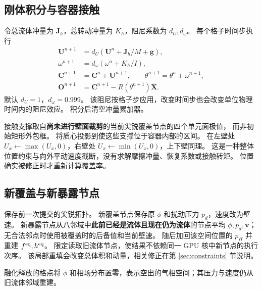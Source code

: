 
\subsection{刚体积分与容器接触}
令总流体冲量为 $\bm J_h$，总转动冲量为 $K_h$，阻尼系数为 $d_U,d_\omega$。
每个格子时间步执行
\begin{align}
 \bm U^{n+1}&=d_U(\bm U^n+\bm J_h/M+\bm g),\\
 \omega^{n+1}&=d_\omega(\omega^n+K_h/I),\\
 \bm C^{n+1}&=\bm C^n+\bm U^{n+1},\qquad
 \theta^{n+1}=\theta^n+\omega^{n+1},\\
 \bm O^{n+1}&=\bm C^{n+1}-R(\theta^{n+1})\bar{\bm X}.
\end{align}
默认 $d_U=1$，$d_\omega=0.999$。
该阻尼按格子步应用，改变时间步也会改变单位物理时间内的阻尼效应。
积分后清空冲量累加器。

接触支撑取自\textbf{尚未进行壁面裁剪}的当前尖锐覆盖节点的四个单元面极值，
而非初始矩形外包框。
将质心投影到使这些支撑位于容器内部的区间。
在左壁处 $U_x\leftarrow\max(U_x,0)$，右壁处
$U_x\leftarrow\min(U_x,0)$，上下壁同理。
这是一种整体位置约束与向外平动速度截断，没有求解摩擦冲量、恢复系数或接触转矩。
位置确实被修正时才重新计算覆盖率。

\subsection{新覆盖与新暴露节点}
 保存前一次提交的尖锐拓扑。
新覆盖节点保存原 $\phi$ 和扰动压力 $p_d$，速度改为壁速。
新暴露节点从八邻域中\textbf{此前已经是流体且现在仍为流体}的节点平均
$\phi,p_d,\bm v$；无合法邻点时使用被覆盖时的后备值和当前壁速。
随后加回该空间位置的 $p_H$ 并重建 $f^{\rm eq},h^{\rm eq}$。
限定读取旧流体节点，使结果不依赖同一 GPU 核中新节点的执行次序。
该局部重填会改变总体积和动量，相关修正在第 \ref{sec:constraints} 节说明。


融化释放的格点将 $\phi$ 和相场分布置零，表示空出的气相空间；其压力与速度仍从旧流体邻域重建。
